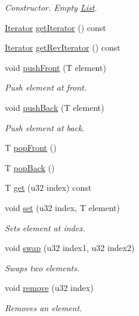 \begin{DoxyCompactItemize}
\begin{DoxyCompactList}\small\item\em Constructor. Empty \hyperlink{classDE_1_1List}{List}. \end{DoxyCompactList}\item 
\hyperlink{classDE_1_1List_1_1Iterator}{Iterator} \hyperlink{classDE_1_1List_ac3d3291c86f3305c42e335abdc59a742}{get\+Iterator} () const 
\item 
\hyperlink{classDE_1_1List_1_1Iterator}{Iterator} \hyperlink{classDE_1_1List_abbef5a7352be5aa7dc1d83c1f4f97545}{get\+Rev\+Iterator} () const 
\item 
void \hyperlink{classDE_1_1List_a5b0ce6f5a23e9dbd8b0eb9ae33b98a90}{push\+Front} (T element)
\begin{DoxyCompactList}\small\item\em Push element at front. \end{DoxyCompactList}\item 
void \hyperlink{classDE_1_1List_a93687c23229ed4963ff46f356c890bb4}{push\+Back} (T element)
\begin{DoxyCompactList}\small\item\em Push element at back. \end{DoxyCompactList}\item 
T \hyperlink{classDE_1_1List_ae50e4be01d09c2358cc79ccc56957c8d}{pop\+Front} ()
\item 
T \hyperlink{classDE_1_1List_a06c1593097f2543ca95b0d3bf5a6238c}{pop\+Back} ()
\item 
T \hyperlink{classDE_1_1List_ad2ea5f64a6f88b5f4143e4c71b5cad90}{get} (u32 index) const 
\item 
void \hyperlink{classDE_1_1List_a5e08633adfca77bec7f47117120ac5fd}{set} (u32 index, T element)
\begin{DoxyCompactList}\small\item\em Sets element at index. \end{DoxyCompactList}\item 
void \hyperlink{classDE_1_1List_a0d06f7ac8784ecf3f15f1469b3bb29bc}{swap} (u32 index1, u32 index2)
\begin{DoxyCompactList}\small\item\em Swaps two elements. \end{DoxyCompactList}\item 
void \hyperlink{classDE_1_1List_ab70462cf280a4459adb6c837fa20a494}{remove} (u32 index)
\begin{DoxyCompactList}\small\item\em Removes an element. \end{DoxyCompactList}\item 

\end{DoxyCompactItemize}
